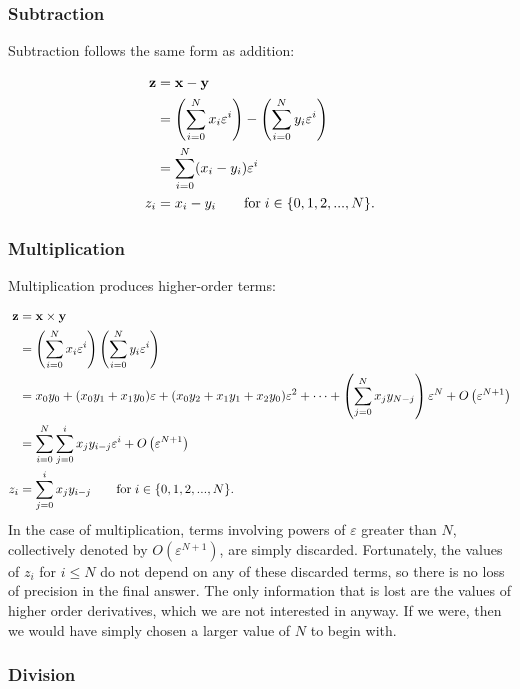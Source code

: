 \documentclass{article}
\begin{document}
\subsubsection{Subtraction}

Subtraction follows the same form as addition:

\begin{align*}
{\bf z} &= {\bf x} - {\bf y} \\
 &= \left(\sum_{i=0}^Nx_i\varepsilon^i\right) - \left(\sum_{i=0}^Ny_i\varepsilon^i\right) \\
 &= \sum_{i=0}^N(x_i-y_i)\varepsilon^i \\
z_i &= x_i - y_i \qquad \text{for}\; i\in\{0,1,2,...,N\}.
\end{align*}

\subsubsection{Multiplication}

Multiplication produces higher-order terms:

\begin{align*}
{\bf z} &= {\bf x} \times {\bf y} \\
 &= \left(\sum_{i=0}^Nx_i\varepsilon^i\right) \left(\sum_{i=0}^Ny_i\varepsilon^i\right) \\
 &= x_0y_0 + (x_0y_1+x_1y_0)\varepsilon + (x_0y_2+x_1y_1+x_2y_0)\varepsilon^2 + \cdots +
    \left(\sum_{j=0}^Nx_jy_{N-j}\right)\varepsilon^N + O\left(\varepsilon^{N+1}\right) \\
 &= \sum_{i=0}^N\sum_{j=0}^ix_jy_{i-j}\varepsilon^i + O\left(\varepsilon^{N+1}\right) \\
z_i &= \sum_{j=0}^ix_jy_{i-j} \qquad \text{for}\; i\in\{0,1,2,...,N\}.
\end{align*}
In the case of multiplication, terms involving powers of $\varepsilon$ greater than $N$, collectively denoted
by $O\left(\varepsilon^{N+1}\right)$, are simply discarded. Fortunately, the values of $z_i$ for $i\le N$ do not
depend on any of these discarded terms, so there is no loss of precision in the final answer. The only information
that is lost are the values of higher order derivatives, which we are not interested in anyway. If we were, then
we would have simply chosen a larger value of $N$ to begin with.

\subsubsection{Division}
\end{document}

